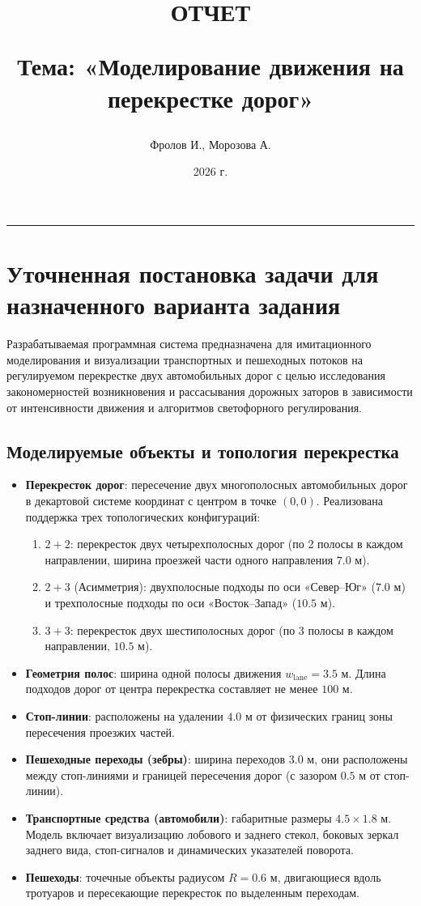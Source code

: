 \documentclass[11pt, a4paper]{article}
\title{\textbf{ОТЧЕТ} \par\vspace{0.5em} {\Large Тема: «Моделирование движения на перекрестке дорог»}}
\author{Фролов И., Морозова А.}
\date{2026 г.}
\begin{document}
\maketitle
\tableofcontents
\vspace{1cm}
\hrule
\vspace{0.5cm}

\section{Уточненная постановка задачи для назначенного варианта задания}
Разрабатываемая программная система предназначена для имитационного моделирования и визуализации транспортных и пешеходных потоков на регулируемом перекрестке двух автомобильных дорог с целью исследования закономерностей возникновения и рассасывания дорожных заторов в зависимости от интенсивности движения и алгоритмов светофорного регулирования.

\subsection{Моделируемые объекты и топология перекрестка}
\begin{itemize}
  \item \textbf{Перекресток дорог}: пересечение двух многополосных автомобильных дорог в декартовой системе координат с центром в точке $(0, 0)$. Реализована поддержка трех топологических конфигураций:
  \begin{enumerate}
    \item $2+2$: перекресток двух четырехполосных дорог (по 2 полосы в каждом направлении, ширина проезжей части одного направления $7.0\text{ м}$).
    \item $2+3$ (Асимметрия): двухполосные подходы по оси «Север--Юг» ($7.0\text{ м}$) и трехполосные подходы по оси «Восток--Запад» ($10.5\text{ м}$).
    \item $3+3$: перекресток двух шестиполосных дорог (по 3 полосы в каждом направлении, $10.5\text{ м}$).
  \end{enumerate}
  \item \textbf{Геометрия полос}: ширина одной полосы движения $w_{\text{lane}} = 3.5\text{ м}$. Длина подходов дорог от центра перекрестка составляет не менее $100\text{ м}$.
  \item \textbf{Стоп-линии}: расположены на удалении $4.0\text{ м}$ от физических границ зоны пересечения проезжих частей.
  \item \textbf{Пешеходные переходы (зебры)}: ширина переходов $3.0\text{ м}$, они расположены между стоп-линиями и границей пересечения дорог (с зазором $0.5\text{ м}$ от стоп-линии).
  \item \textbf{Транспортные средства (автомобили)}: габаритные размеры $4.5 \times 1.8\text{ м}$. Модель включает визуализацию лобового и заднего стекол, боковых зеркал заднего вида, стоп-сигналов и динамических указателей поворота.
  \item \textbf{Пешеходы}: точечные объекты радиусом $R = 0.6\text{ м}$, двигающиеся вдоль тротуаров и пересекающие перекресток по выделенным переходам.
\end{itemize}
\end{document}
